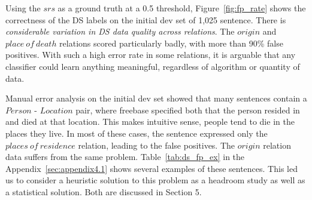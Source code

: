 Using the $srs$ as a ground truth at a 0.5 threshold, Figure~\ref{fig:fp_rate} shows the correctness of the DS labels on the initial dev set of 1,025 sentence. There is \textit{considerable variation in DS data quality across relations}. The $origin$ and $place\ of\ death$ relations scored particularly badly, with more than 90\% false positives. With such a high error rate in some relations, it is arguable that any classifier could learn anything meaningful, regardless of algorithm or quantity of data.

Manual error analysis on the initial dev set showed that many sentences contain a $Person$ - $Location$ pair, where freebase specified both that the person resided in and died at that location. This makes intuitive sense, people tend to die in the places they live.  In most of these cases, the sentence expressed only the $places\ of\ residence$ relation, leading to the false positives. The $origin$ relation data suffers from the same problem.  Table~\ref{tab:ds_fp_ex} in the Appendix~\ref{sec:appendix4.1} shows several examples of these sentences. This led us to consider a heuristic solution to this problem as a headroom study as well as a statistical solution. Both are discussed in Section 5.

